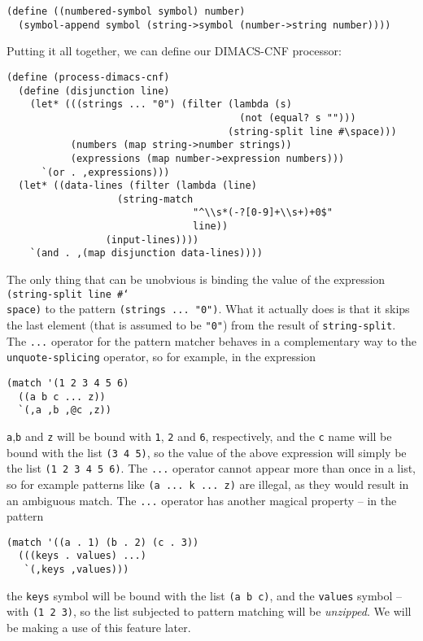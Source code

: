 \begin{Verbatim}[samepage=true]
(define ((numbered-symbol symbol) number)
  (symbol-append symbol (string->symbol (number->string number))))
\end{Verbatim}

Putting it all together, we can define our DIMACS-CNF
processor:

\begin{Verbatim}[samepage=true]
(define (process-dimacs-cnf)
  (define (disjunction line)
    (let* (((strings ... "0") (filter (lambda (s)
                                        (not (equal? s "")))
                                      (string-split line #\space)))
           (numbers (map string->number strings))
           (expressions (map number->expression numbers)))
      `(or . ,expressions)))
  (let* ((data-lines (filter (lambda (line)
			       (string-match 
                                "^\\s*(-?[0-9]+\\s+)+0$" 
                                line))
			     (input-lines))))
    `(and . ,(map disjunction data-lines))))
\end{Verbatim}

The only thing that can be unobvious is binding the value
of the expression \texttt{(string-split line \#\char`\\space)}
to the pattern \texttt{(strings ... "0")}. What it actually
does is that it skips the last element (that is assumed to
be \texttt{"0"}) from the result of \texttt{string-split}.
The \texttt{...} operator for the pattern matcher behaves
in a complementary way to the \texttt{unquote-splicing}
operator, so for example, in the expression
\begin{Verbatim}[samepage=true]
(match '(1 2 3 4 5 6)
  ((a b c ... z))
  `(,a ,b ,@c ,z))
\end{Verbatim}
\texttt{a},\texttt{b} and \texttt{z} will be bound with
\texttt{1}, \texttt{2} and \texttt{6}, respectively, and the
\texttt{c} name will be bound with the list \texttt{(3 4 5)},
so the value of the above expression will simply be the list
\texttt{(1 2 3 4 5 6)}. The \texttt{...} operator cannot
appear more than once in a list, so for example patterns like
\texttt{(a ... k ... z)} are illegal, as they would result
in an ambiguous match. The \texttt{...} operator has
another magical property -- in the pattern
\begin{Verbatim}[samepage=true]
(match '((a . 1) (b . 2) (c . 3))
  (((keys . values) ...)
   `(,keys ,values)))
\end{Verbatim}
the \texttt{keys} symbol will be bound with the list \texttt{(a b c)},
and the \texttt{values} symbol -- with \texttt{(1 2 3)}, so the
list subjected to pattern matching will be \textit{unzipped}.
We will be making a use of this feature later.

